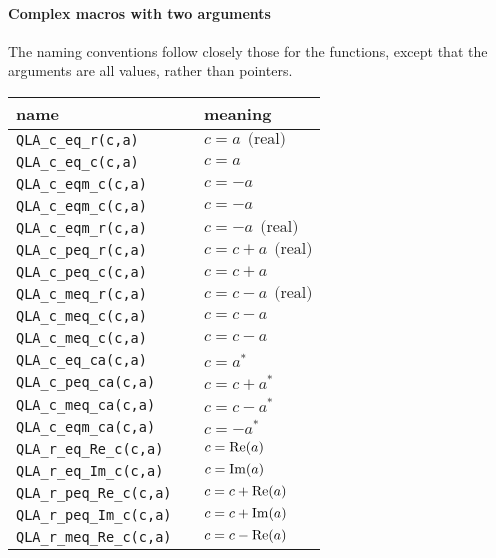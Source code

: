 \documentclass{article}
\renewcommand{\Re}{\mathop{\rm Re}}
\renewcommand{\Im}{\mathop{\rm Im}}
\begin{document}
\paragraph{Complex macros with two arguments}

The naming conventions follow closely those for the functions, except
that the arguments are all values, rather than pointers.

\begin{center}
\begin{tabular}{|l|l|}
\hline
  name           & meaning      \\
\hline
\verb|QLA_c_eq_r(c,a)      | & $ c = a \ \ \mbox{(real)}        $ \\
\verb|QLA_c_eq_c(c,a)      | & $ c = a                          $ \\
\verb|QLA_c_eqm_c(c,a)     | & $ c = -a                         $ \\
\verb|QLA_c_eqm_c(c,a)     | & $ c = -a                         $ \\
\verb|QLA_c_eqm_r(c,a)     | & $ c = -a \ \ \mbox{(real)}       $ \\
\verb|QLA_c_peq_r(c,a)     | & $ c = c +  a \ \ \mbox{(real)}   $ \\
\verb|QLA_c_peq_c(c,a)     | & $ c = c +  a                     $ \\
\verb|QLA_c_meq_r(c,a)     | & $ c = c -  a \ \ \mbox{(real)}   $ \\
\verb|QLA_c_meq_c(c,a)     | & $ c = c -  a                     $ \\
\verb|QLA_c_meq_c(c,a)     | & $ c = c -  a                     $ \\
\verb|QLA_c_eq_ca(c,a)     | & $ c =  a^*                       $ \\
\verb|QLA_c_peq_ca(c,a)    | & $ c = c +  a^*                   $ \\
\verb|QLA_c_meq_ca(c,a)    | & $ c = c -  a^*                   $ \\
\verb|QLA_c_eqm_ca(c,a)    | & $ c =- a^*                       $ \\
\verb|QLA_r_eq_Re_c(c,a)   | & $ c = \Re(a)                     $ \\
\verb|QLA_r_eq_Im_c(c,a)   | & $ c = \Im(a)                     $ \\
\verb|QLA_r_peq_Re_c(c,a)  | & $ c = c +  \Re(a)                $ \\
\verb|QLA_r_peq_Im_c(c,a)  | & $ c = c +  \Im(a)                $ \\
\verb|QLA_r_meq_Re_c(c,a)  | & $ c = c -  \Re(a)                $ \\

\end{tabular}
\end{center}
\end{document}
